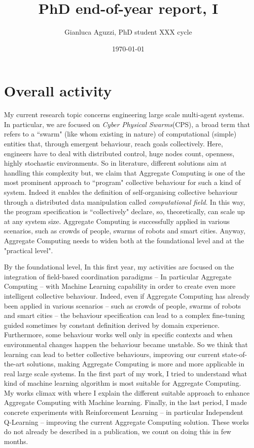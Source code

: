 \documentclass[12pt]{article}
\begin{document}
\title{PhD end-of-year report, I}
\author{Gianluca Aguzzi, PhD student XXX cycle}
\date{\today}
\maketitle

\section{Overall activity}
My current research topic concerns engineering large scale multi-agent systems. In particular, we are
 focused on \textit{Cyber Physical Swarms}(CPS), a broad term that refers to a ``swarm" (like whom
 existing in nature) of computational (simple) entities that, through emergent behaviour, reach goals collectively.  
%
Here, engineers have to deal with distributed control, huge nodes count, openness, highly stochastic environments.
%
So in literature, different solutions aim at handling this complexity but, we claim that Aggregate Computing is one of the most
 prominent approach to ``program" collective behaviour for such a kind of system.
%
Indeed it enables the definition of self-organising collective behaviour through a distributed data manipulation called \textit{computational field}. In this way, the program specification is ``collectively" declare, so, theoretically,
 can scale up at any system size.
%
Aggregate Computing is successfully applied in various scenarios, such as crowds of people, swarms of robots and smart cities.
%
Anyway, Aggregate Computing needs to widen both at the foundational level and at the "practical level".

By the foundational level, In this first year, my activities are focused on the integration of field-based coordination paradigms 
 -- In particular Aggregate Computing -- with Machine Learning capability 
 in order to create even more intelligent collective behaviour.
%
Indeed, even if Aggregate Computing has already been applied in various scenarios -- 
 such as crowds of people, swarms of robots and smart cities -- the behaviour specification can lead to
 a complex fine-tuning guided sometimes by constant definition derived by domain experience.
%
Furthermore, some behaviour works well only in specific contexts and when environmental
 changes happen the behaviour became unstable.
%
So we think that learning can lead to better collective behaviours, 
 improving our current state-of-the-art solutions, making Aggregate 
 Computing is more and more applicable in real large scale systems.
%
In the first part of my work, I tried to understand what 
 kind of machine learning algorithm is most suitable for Aggregate Computing.
%
My works climax with \textit{} where I explain the different suitable approach
 to enhance Aggregate Computing with Machine learning.
%
Finally, in the last period, I made concrete experiments with 
 Reinforcement Learning -- in particular Independent Q-Learning -- improving the current Aggregate Computing solution. 
 These works do not already be described in a publication,
 we count on doing this in few months.
\end{document}
